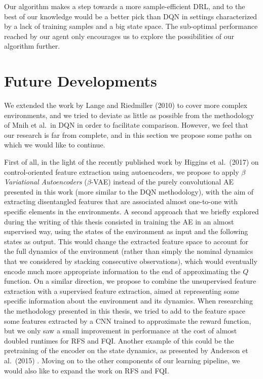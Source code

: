 Our algorithm makes a step towards a more sample-efficient DRL, and to the
best of our knowledge would be a better pick than DQN in settings characterized 
by a lack of training samples and a big state space. The sub-optimal performance
reached by our agent only encourages us to explore the possibilities of our
algorithm further.

\section{Future Developments}
We extended the work by Lange and Riedmiller (2010) \cite{lange2010deep} to 
cover more complex environments, and we tried to deviate as little as possible 
from the methodology of Mnih et al.\ in DQN in order to facilitate comparison. 
However, we feel that our research is far from complete, and in this section we 
propose some paths on which we would like to continue. 

First of all, in the light of the recently published work by Higgins et 
al.\ (2017) \cite{higgins2017darla} on control-oriented feature extraction using 
autoencoders, we propose to apply \textit{$\beta$ Variational Autoencoders} 
($\beta$-VAE) \cite{kingma2014auto, higgins2017beta} instead of the purely 
convolutional AE presented in this work (more similar to the DQN methodology), 
with the aim of extracting disentangled features that are associated almost 
one-to-one with specific elements in the environments.
A second approach that we briefly explored during the writing of this thesis 
consisted in training the AE in an almost supervised way, using the states of 
the environment as input and the following states as output. 
This would change the extracted feature space to account for the full dynamics 
of the environment (rather than simply the nominal dynamics that we considered 
by stacking consecutive observations), which would eventually 
encode much more appropriate information to the end of approximating the $Q$ 
function. 
On a similar direction, we propose to combine the unsupervised feature 
extraction with a supervised feature extraction, aimed at representing some 
specific information about the environment and its dynamics. 
When researching the methodology presented in this thesis, we tried to add to the 
feature space some features extracted by a CNN trained to approximate the reward 
function, but we only saw a small improvement in performance at the cost of 
almost doubled runtimes for RFS and FQI. 
Another example of this could be the pretraining of the encoder on the state 
dynamics, as presented by Anderson et al.\ (2015) \cite{anderson2015faster}.
Moving on to the other components of our learning pipeline, we would also like 
to expand the work on RFS and FQI. 

